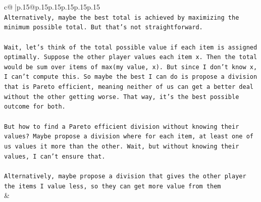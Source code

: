 \documentclass{article}
\begin{document}
{\begin{supertabular}{c@{$\;$}|p{.15\linewidth}@{}p{.15\linewidth}p{.15\linewidth}p{.15\linewidth}p{.15\linewidth}p{.15\linewidth}}
{{{\\ 
\texttt{Alternatively, maybe the best total is achieved by maximizing the minimum possible total. But that's not straightforward.} \\
\\ 
\texttt{Wait, let's think of the total possible value if each item is assigned optimally. Suppose the other player values each item x. Then the total would be sum over items of max(my value, x). But since I don't know x, I can't compute this. So maybe the best I can do is propose a division that is Pareto efficient, meaning neither of us can get a better deal without the other getting worse. That way, it's the best possible outcome for both.} \\
\\ 
\texttt{But how to find a Pareto efficient division without knowing their values? Maybe propose a division where for each item, at least one of us values it more than the other. Wait, but without knowing their values, I can't ensure that.} \\
\\ 
\texttt{Alternatively, maybe propose a division that gives the other player the items I value less, so they can get more value from them} \\
            }
        }
    }
    & \\ \\


\end{supertabular}}
\end{document}
